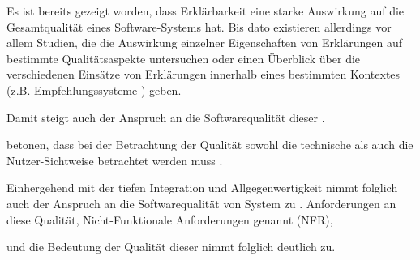 Es ist bereits gezeigt worden, dass Erklärbarkeit eine starke Auswirkung auf die Gesamtqualität eines Software-Systems hat. Bis dato existieren allerdings vor allem Studien, die die Auswirkung einzelner Eigenschaften von Erklärungen auf bestimmte Qualitätsaspekte untersuchen oder einen Überblick über die verschiedenen Einsätze von Erklärungen innerhalb eines bestimmten Kontextes (z.B. Empfehlungssysteme \cite{nunes_systematic_2017}) geben.



\pagebreak

Damit steigt auch der Anspruch an die Softwarequalität dieser \cite{schneider2012abenteuer}. 


\citeauthor{ehsan_human-centered_2020} betonen, dass bei der Betrachtung der Qualität sowohl die technische als auch die Nutzer-Sichtweise betrachtet werden muss \cite{ehsan_human-centered_2020}. 

Einhergehend mit der tiefen Integration und Allgegenwertigkeit nimmt folglich auch der Anspruch an die Softwarequalität von System zu \cite{schneider2012abenteuer}. Anforderungen an diese Qualität, \glqq Nicht-Funktionale Anforderungen genannt\grqq{} (NFR),

und die Bedeutung der Qualität dieser nimmt folglich deutlich zu. 


